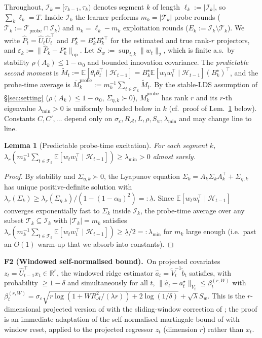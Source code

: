 \documentclass{article}
\newcommand{\R}{\mathbb{R}}
\newcommand{\E}{\mathbb{E}}
\newcommand{\op}{\mathrm{op}}
\newcommand{\cA}{\mathcal{A}}
\newcommand{\cH}{\mathcal{H}}
\newcommand{\cT}{\mathcal{T}}
\newcommand{\cI}{\mathcal{I}}
\newcommand{\cTprobe}{\mathcal{T}_{\mathrm{probe}}}
\newtheorem{lemma}{Lemma}
\begin{document}
Throughout, $\cI_k = [\tau_{k-1}, \tau_k)$ denotes segment $k$ of
length $\ell_k := |\cI_k|$, so $\sum_k \ell_k = T$. Inside $\cI_k$ the
learner performs $m_k = |\cT_k|$ probe rounds ($\cT_k := \cTprobe\cap\cI_k$)
and $n_k = \ell_k - m_k$ exploitation rounds ($E_k := \cI_k\setminus\cT_k$).
We write $\widehat P_t = \widehat U_t \widehat U_t^\top$ and
$P_k^\star = B_k^\star B_k^{\star\top}$ for the estimated and true rank-$r$
projectors, and $\varepsilon_k := \|\widehat P_k - P_k^\star\|_{\op}$.
Let $S_w := \sup_{t,k}\|w_t\|_2$, which is finite a.s.\ by stability
$\rho(A_k)\le 1-\alpha_0$ and bounded innovation covariance.
The \emph{predictable second moment} is
$\widetilde M_t := \E[\theta_t\theta_t^\top\mid\cH_{t-1}]
= B_k^\star \E[w_tw_t^\top\mid\cH_{t-1}](B_k^\star)^\top$, and the
probe-time average is
$\bar M_k^{\mathrm{probe}} := m_k^{-1}\sum_{t\in\cT_k}\widetilde M_t$.
By the stable-LDS assumption of \S\ref{sec:setting}
($\rho(A_k)\le 1-\alpha_0$, $\Sigma_{\eta,k}\succ 0$), $\bar M_k^{\mathrm{probe}}$ has rank $r$
and its $r$-th eigenvalue $\lambda_{\min}>0$ is uniformly bounded
below in $k$ (cf.\ proof of
Lem.~\ref{lem:probe_excitation_conf} below).
Constants $C,C',\ldots$ depend only on
$\sigma_\varepsilon, R_\cA, L, \rho, S_w, \lambda_{\min}$ and may
change line to line.

\begin{lemma}[Predictable probe-time excitation]
\label{lem:probe_excitation_conf}
For each segment $k$,
$\lambda_r\!\left(m_k^{-1}\sum_{t\in\cT_k}\E[w_tw_t^\top\mid\cH_{t-1}]\right)
\ge \lambda_{\min}>0$ almost surely.
\end{lemma}
\begin{proof}
By stability and $\Sigma_{\eta,k}\succ 0$, the Lyapunov equation
$\Sigma_k = A_k\Sigma_k A_k^\top + \Sigma_{\eta,k}$ has unique
positive-definite solution with $\lambda_r(\Sigma_k) \ge
\lambda_r(\Sigma_{\eta,k})/(1-(1-\alpha_0)^2) =: \underline\lambda$.
Since $\E[w_tw_t^\top\mid\cH_{t-1}]$ converges exponentially fast to
$\Sigma_k$ inside $\cI_k$, the probe-time average over any subset
$\cT_k\subseteq\cI_k$ with $|\cT_k|=m_k$ satisfies
$\lambda_r(m_k^{-1}\sum_{t\in\cT_k}\E[w_tw_t^\top\mid\cH_{t-1}])
\ge \underline\lambda/2 =: \lambda_{\min}$ for $m_k$ large enough
(i.e.\ past an $O(1)$ warm-up that we absorb into constants).
\end{proof}

\noindent\textbf{F2 (Windowed self-normalised bound).}\ On projected
covariates $z_t = \widehat U_{t-1}^\top x_t\in\R^r$, the windowed ridge
estimator $\widehat a_t = \widetilde V_t^{-1}\widetilde b_t$ satisfies,
with probability $\ge 1-\delta$ and simultaneously for all $t$,
$\|\widehat a_t - a_t^\star\|_{\widetilde V_t}\le\beta^{(r,W)}_t$
with
$\beta^{(r,W)}_t = \sigma_\varepsilon\sqrt{r\log(1+WR_\cA^2/(\lambda r)) + 2\log(1/\delta)} + \sqrt\lambda S_w$.
This is the $r$-dimensional projected version of
\citet[Thm.~2]{abbasi2011improved} with the sliding-window correction
of \citet{russac2019weighted}; the proof is an immediate adaptation
of the self-normalised martingale bound of
\citet[Thm.~1]{abbasi2011improved} with window reset, applied to the
projected regressor $z_t$ (dimension $r$) rather than $x_t$.
\end{document}
